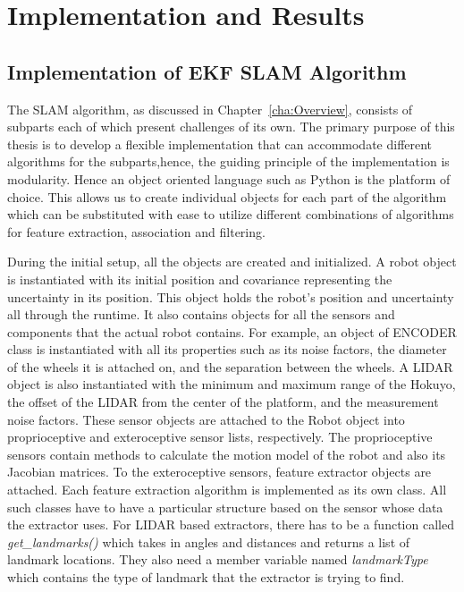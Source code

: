 \chapter{Implementation and Results}
\label{cha:results}

\section{Implementation of EKF SLAM Algorithm}
\label{sec:slam_process}
The SLAM algorithm, as discussed in Chapter~\ref{cha:Overview}, consists of subparts each of which present challenges of its own. The primary purpose of this thesis is to develop a flexible implementation that can accommodate different algorithms for the subparts,hence, the guiding principle of the implementation is modularity. Hence an object oriented language such as Python is the platform of choice. This allows us to create individual objects for each part of the algorithm which can be substituted with ease to utilize different combinations of algorithms for feature extraction, association and filtering. 

During the initial setup, all the objects are created and initialized. A robot object is instantiated with its initial position and covariance representing the uncertainty in its position. This object holds the robot's position and uncertainty all through the runtime. It also contains objects for all the sensors and components that the actual robot contains. For example, an object of ENCODER class is instantiated with all its properties such as its noise factors, the diameter of the wheels it is attached on, and the separation between the wheels. A LIDAR object is also instantiated with the minimum and maximum range of the Hokuyo, the offset of the LIDAR from the center of the platform, and the measurement noise factors. These sensor objects are attached to the Robot object into proprioceptive and exteroceptive sensor lists, respectively. The proprioceptive sensors contain methods to calculate the motion model of the robot and also its Jacobian matrices.
To the exteroceptive sensors, feature extractor objects are attached. Each feature extraction algorithm is implemented as its own class. All such classes have to have a particular structure based on the sensor whose data the extractor uses. For LIDAR based extractors,  there has to be a function called \textit{get\_landmarks()} which takes in angles and distances and returns a list of landmark locations. They also need a member variable named \textit{landmarkType} which contains the type of landmark that the extractor is trying to find. 

